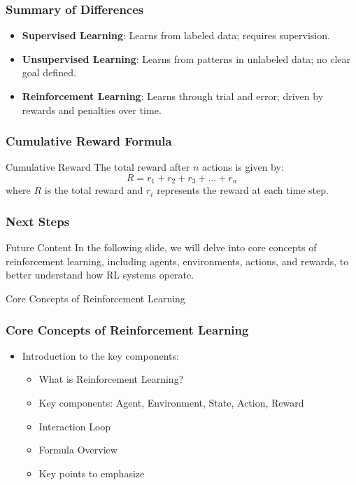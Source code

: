 \documentclass[aspectratio=169]{beamer}
\begin{document}
\begin{frame}[fragile]
    \frametitle{Summary of Differences}
    \begin{itemize}
        \item \textbf{Supervised Learning}: Learns from labeled data; requires supervision.
        \item \textbf{Unsupervised Learning}: Learns from patterns in unlabeled data; no clear goal defined.
        \item \textbf{Reinforcement Learning}: Learns through trial and error; driven by rewards and penalties over time.
    \end{itemize}
\end{frame}

\begin{frame}[fragile]
    \frametitle{Cumulative Reward Formula}
    \begin{block}{Cumulative Reward}
        The total reward after \( n \) actions is given by:
        \begin{equation}
            R = r_1 + r_2 + r_3 + ... + r_n
        \end{equation}
        where \( R \) is the total reward and \( r_i \) represents the reward at each time step.
    \end{block}
\end{frame}

\begin{frame}[fragile]
    \frametitle{Next Steps}
    \begin{block}{Future Content}
        In the following slide, we will delve into core concepts of reinforcement learning, including agents, environments, actions, and rewards, to better understand how RL systems operate.
    \end{block}
\end{frame}

\begin{frame}[fragile]{Core Concepts of Reinforcement Learning}
    \frametitle{Core Concepts of Reinforcement Learning}
    \begin{itemize}
        \item Introduction to the key components:
        \begin{itemize}
            \item What is Reinforcement Learning?
            \item Key components: Agent, Environment, State, Action, Reward
            \item Interaction Loop
            \item Formula Overview
            \item Key points to emphasize
        \end{itemize}
    \end{itemize}
\end{frame}
\end{document}
